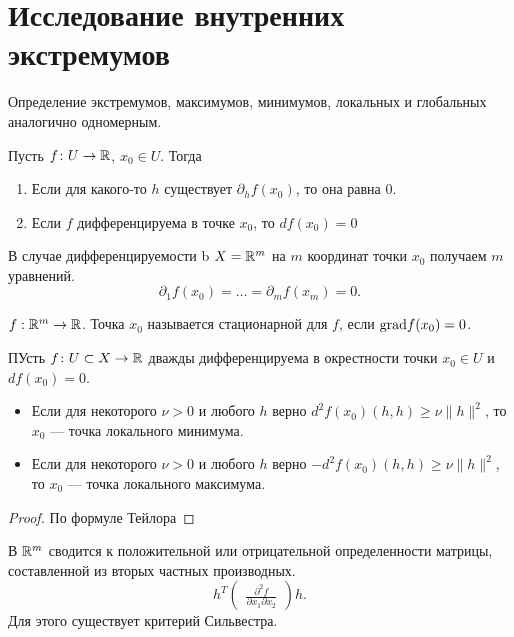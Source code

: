 \documentclass[11pt,dvipsnames]{report}
\begin{document}
\section{Исследование внутренних экстремумов}
\begin{defn}
    Определение экстремумов, максимумов, минимумов, локальных и глобальных аналогично одномерным.
\end{defn}
\begin{thm}
    Пусть $ f\colon U \to  \mathbb{R}$, $ x_0 \in U$. Тогда
    \begin{enumerate}[noitemsep]
	\item Если для какого-то $ h$ существует  $ \partial _h f(x_0)$, то она равна 0.
	\item Если $ f$ дифференцируема в точке  $ x_0$, то $ df(x_0) = 0$
    \end{enumerate}
\end{thm}
\begin{note}
    В случае дифференцируемости b $ X = \mathbb{R}^{m}$ на $ m$ координат точки  $ x_0$ получаем $ m$ уравнений.
    \[
	\partial _1 f(x_0) = \ldots = \partial _m f(x_m) = 0
    .\] 
\end{note}
\begin{defn}
    $ f: \mathbb{R}^{m } \to  \mathbb{R}$.
    Точка $ x_0$ называется {\sf   стационарной} для $ f$, если  $ {\mathop{\text{\rm grad}}} f(x_0) = 0$.
\end{defn}
\begin{thm}
    ПУсть $ f\colon U \subset X \to  \mathbb{R}$ дважды дифференцируема в окрестности точки $ x_0 \in  U$ и $ df(x_0) = 0$.
    \begin{itemize}[noitemsep]
	\item Если для некоторого $ \nu >0 $ и любого  $ h$ верно $ d^2f(x_0) (h, h) \ge  \nu \| h \|^2 $, то $ x_0$ --- точка локального минимума.
	\item Если для некоторого $ \nu >0 $ и любого  $ h$ верно $ -d^2f(x_0) (h, h) \ge  \nu \| h \|^2 $, то $ x_0$ --- точка локального максимума.
    \end{itemize}
\end{thm}
\begin{proof}
    По формуле Тейлора
\end{proof}
\begin{note}
    В $ \mathbb{R}^{m}$ сводится к положительной или отрицательной определенности матрицы, составленной из вторых частных производных. 
    \[
    h^{T} 
    \begin{pmatrix}
    \frac{\partial ^2f}{\partial x_1 \partial x_2} 
    \end{pmatrix}
    h
    .\] 
    Для этого существует критерий Сильвестра.
\end{note}
\end{document}
